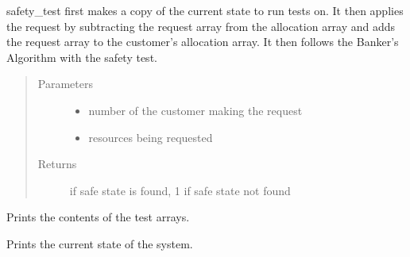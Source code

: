 \documentclass[letterpaper,10pt,english,openany,oneside]{sphinxmanual}
\begin{document}
\begin{fulllineitems}
safety\_test first makes a copy of the current state to run tests on. It then
applies the request by subtracting the request array from the allocation
array and adds the request array to the customer’s allocation array. It then
follows the Banker’s Algorithm with the safety test.
\begin{quote}\begin{description}
\item[{Parameters}] \leavevmode\begin{itemize}
\item {} 
 \textendash{} number of the customer making the request

\item {} 
 \textendash{} resources being requested

\end{itemize}

\item[{Returns}]  if safe state is found, \sphinxhyphen{}1 if safe state not found

\end{description}\end{quote}

\end{fulllineitems}


\begin{fulllineitems}
\label{\detokenize{source_code:c.print_test_state}}%
\pysigstartmultiline
{}%
\pysigstopmultiline
Prints the contents of the test arrays.

\end{fulllineitems}


\begin{fulllineitems}
\label{\detokenize{source_code:c.print_state}}%
\pysigstartmultiline
{}%
\pysigstopmultiline
Prints the current state of the system.

\end{fulllineitems}
\end{document}
